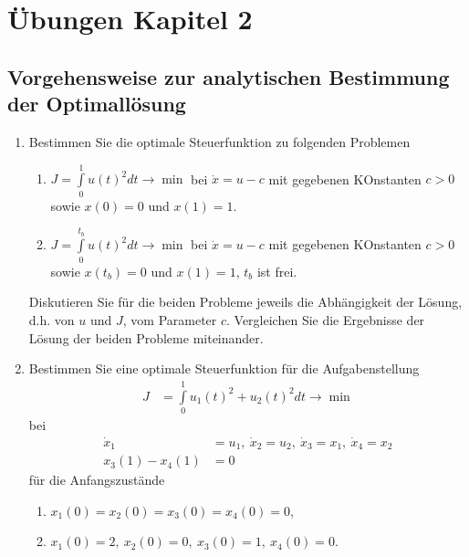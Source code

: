 \section*{Übungen Kapitel 2}
\label{sec:uebung_kapitel_2}

\subsection*{Vorgehensweise zur analytischen Bestimmung der Optimallösung}
\label{sec:uebung_anal_best_opt_lsg}
\begin{enumerate}
  \item Bestimmen Sie die optimale Steuerfunktion zu folgenden Problemen
  \begin{enumerate}
    \item $J = \int\limits_0^1 u(t)^2dt\rightarrow\min$ bei $\dot{x}=u-c$ mit gegebenen KOnstanten $c>0$ sowie $x(0)=0$ und $x(1)=1$.
    \item $J = \int\limits_0^{t_b} u(t)^2dt\rightarrow\min$ bei $\dot{x}=u-c$ mit gegebenen KOnstanten $c>0$ sowie $x(t_b)=0$ und $x(1)=1$, $t_b$ ist
    frei.
  \end{enumerate}
  Diskutieren Sie für die beiden Probleme jeweils die Abhängigkeit der Lösung, d.h. von $u$ und $J$, vom Parameter $c$. Vergleichen Sie die Ergebnisse
  der Lösung der beiden Probleme miteinander. 
  \item Bestimmen Sie eine optimale Steuerfunktion für die Aufgabenstellung
  \begin{align*}
  	J & = \int\limits_0^1 u_1(t)^2+u_2(t)^2 dt\rightarrow\min
  \end{align*} 
  bei
  \begin{align*}
  	\dot{x}_1 & = u_1,\ \dot{x}_2=u_2,\ \dot{x}_3=x_1,\ \dot{x}_4=x_2\\
  	x_3(1)-x_4(1) & = 0
  \end{align*}
  für die Anfangszustände
  \begin{enumerate}
    \item $x_1(0) = x_2(0)=x_3(0)=x_4(0)=0$,
    \item $x_1(0) = 2,\ x_2(0)=0,\ x_3(0)=1,\ x_4(0)=0$.
  \end{enumerate}
\end{enumerate}

